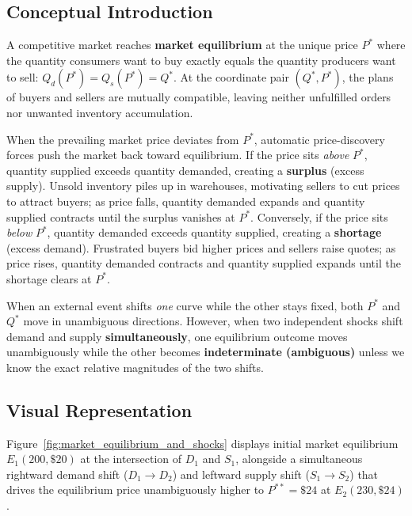 \documentclass[11pt,letterpaper]{article}
\begin{document}
\subsection*{Conceptual Introduction}
A competitive market reaches \textbf{market equilibrium} at the unique price $P^*$ where the quantity consumers want to buy exactly equals the quantity producers want to sell: $Q_d(P^*) = Q_s(P^*) = Q^*$. At the coordinate pair $(Q^*, P^*)$, the plans of buyers and sellers are mutually compatible, leaving neither unfulfilled orders nor unwanted inventory accumulation.

When the prevailing market price deviates from $P^*$, automatic price-discovery forces push the market back toward equilibrium. If the price sits \emph{above} $P^*$, quantity supplied exceeds quantity demanded, creating a \textbf{surplus} (excess supply). Unsold inventory piles up in warehouses, motivating sellers to cut prices to attract buyers; as price falls, quantity demanded expands and quantity supplied contracts until the surplus vanishes at $P^*$. Conversely, if the price sits \emph{below} $P^*$, quantity demanded exceeds quantity supplied, creating a \textbf{shortage} (excess demand). Frustrated buyers bid higher prices and sellers raise quotes; as price rises, quantity demanded contracts and quantity supplied expands until the shortage clears at $P^*$.

When an external event shifts \emph{one} curve while the other stays fixed, both $P^*$ and $Q^*$ move in unambiguous directions. However, when two independent shocks shift demand and supply \textbf{simultaneously}, one equilibrium outcome moves unambiguously while the other becomes \textbf{indeterminate (ambiguous)} unless we know the exact relative magnitudes of the two shifts.

\subsection*{Visual Representation}
Figure~\ref{fig:market_equilibrium_and_shocks} displays initial market equilibrium $E_1(200, \$20)$ at the intersection of $D_1$ and $S_1$, alongside a simultaneous rightward demand shift ($D_1 \to D_2$) and leftward supply shift ($S_1 \to S_2$) that drives the equilibrium price unambiguously higher to $P^{**} = \$24$ at $E_2(230, \$24)$.
\end{document}
